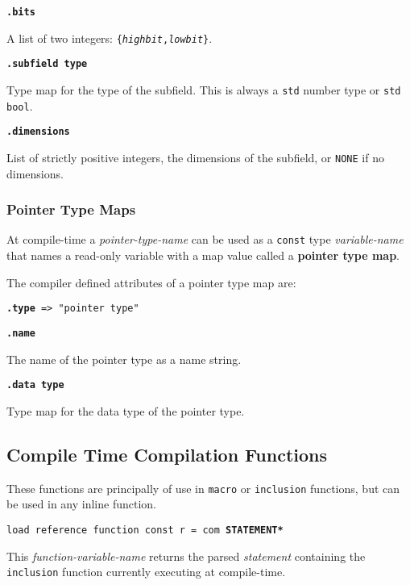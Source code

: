 \documentclass[12pt]{article}
\newcommand{\key}[1]{{\rm \bfseries #1}}
\newcommand{\ttkey}[1]{{\tt \bfseries #1}}
\newenvironment{indpar}[1][0.3in]%
	{\begin{list}{}%
		     {\setlength{\itemsep}{0in}%
		      \setlength{\topsep}{0in}%
		      \setlength{\parsep}{1ex}%
		      \setlength{\labelwidth}{#1}%
		      \setlength{\leftmargin}{#1}%
		      \addtolength{\leftmargin}{\labelsep}}%
	 \item}%
	{\end{list}}
\begin{document}
\ttkey{.bits}
\begin{indpar}
A list of two integers: {\tt \{{\rm \em highbit},{\rm \em lowbit}\}}.
\end{indpar}

\ttkey{.subfield type}
\begin{indpar}
Type map for the type of the subfield.
This is always a {\tt std} number type or {\tt std bool}.
\end{indpar}

\ttkey{.dimensions}
\begin{indpar}
List of strictly positive integers,
the dimensions of the subfield, or {\tt NONE} if no dimensions.
\end{indpar}

\subsubsection{Pointer Type Maps}
\label{POINTER-TYPE-MAPS}

At compile-time a {\em pointer-type-name} can be used as a {\tt const} type
{\em variable-name} that names a read-only variable with a map value
called a \key{pointer type map}.

The compiler defined attributes of a pointer type map are:

{\tt \ttkey{.type} => "pointer type"}

\ttkey{.name}
\begin{indpar}
The name of the pointer type as a name string.
\end{indpar}

\ttkey{.data type}
\begin{indpar}
Type map for the data type of the pointer type.
\end{indpar}

\subsection{Compile Time Compilation Functions}
\label{COMPILE-TIME-COMPILATION-FUNCTIONS}

These functions are principally of use in {\tt macro} or
{\tt inclusion} functions, but can be used in any inline function.

{\tt load reference function const r = com \ttkey{*STATEMENT*} }%
\label{COM-STATEMENT}
\begin{indpar}
This {\em function-variable-name} returns the parsed {\em statement}
containing the {\tt inclusion} function
currently executing at compile-time.
\end{indpar}
\end{document}
